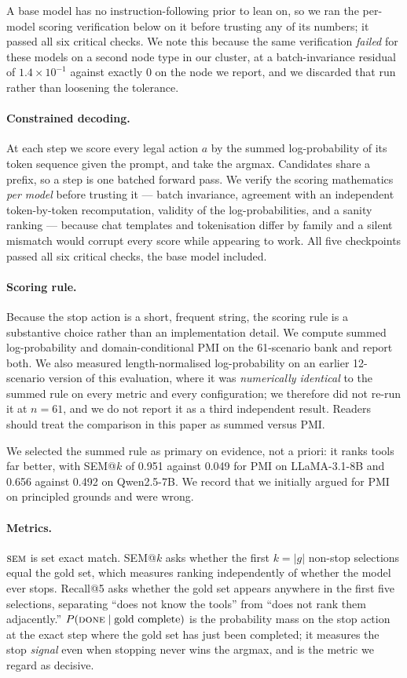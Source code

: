 \documentclass[11pt]{article}
\newcommand{\sem}{\ensuremath{\text{\textsc{sem}}}}
\newcommand{\done}{\ensuremath{\text{\textsc{done}}}}
\begin{document}
A base model has no instruction-following prior to lean on, so we ran the
per-model scoring verification below on it before trusting any of its numbers; it
passed all six critical checks. We note this because the same verification
\emph{failed} for these models on a second node type in our cluster, at a
batch-invariance residual of $1.4\times10^{-1}$ against exactly $0$ on the node we
report, and we discarded that run rather than loosening the tolerance.

\paragraph{Constrained decoding.}
At each step we score every legal action $a$ by the summed log-probability of its
token sequence given the prompt, and take the arg\-max. Candidates share a prefix,
so a step is one batched forward pass. We verify the scoring mathematics
\emph{per model} before trusting it --- batch invariance, agreement with an
independent token-by-token recomputation, validity of the log-probabilities, and a
sanity ranking --- because chat templates and tokenisation differ by family and a
silent mismatch would corrupt every score while appearing to work. All five
checkpoints passed all six critical checks, the base model included.

\paragraph{Scoring rule.}
Because the stop action is a short, frequent string, the scoring rule is a
substantive choice rather than an implementation detail. We compute summed
log-probability and domain-conditional PMI on the 61-scenario bank and report
both. We also measured length-normalised log-probability on an earlier
12-scenario version of this evaluation, where it was \emph{numerically identical}
to the summed rule on every metric and every configuration; we therefore did not
re-run it at $n=61$, and we do not report it as a third independent result.
Readers should treat the comparison in this paper as summed versus PMI.

We selected the summed rule as primary on evidence, not a priori: it ranks tools
far better, with SEM@$k$ of 0.951 against 0.049 for PMI on LLaMA-3.1-8B and 0.656
against 0.492 on Qwen2.5-7B. We record that we initially argued for PMI on
principled grounds and were wrong.

\paragraph{Metrics.}
\sem{} is set exact match. SEM@$k$ asks whether the first $k=|g|$ non-stop
selections equal the gold set, which measures ranking independently of whether the
model ever stops. Recall@5 asks whether the gold set appears anywhere in the first
five selections, separating ``does not know the tools'' from ``does not rank them
adjacently.'' $P(\done \mid \text{gold complete})$ is the probability mass on the
stop action at the exact step where the gold set has just been completed; it
measures the stop \emph{signal} even when stopping never wins the arg\-max, and is
the metric we regard as decisive.
\end{document}
